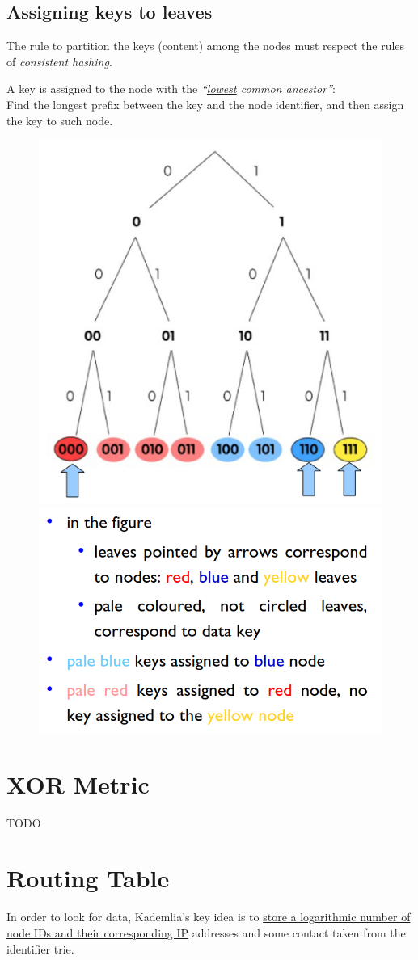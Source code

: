 \subsection{Assigning keys to leaves}
The rule to partition the keys (content) among the nodes must respect the rules of \textit{consistent hashing}.

\begin{paracol}{2}
   \begin{definition}
      A key is assigned to the node with the
      \textit{``\ul{lowest} common ancestor''}:\\
      Find the longest prefix between the
      key and the node identifier, and then assign the key to such node.
   \end{definition}
   \switchcolumn
   \begin{figure}[htbp]
      \centering
      \includegraphics[width=0.45\columnwidth]{images/kademlia_leaves01.png}
      \includegraphics[width=0.45\columnwidth]{images/kademlia_leaves02.png}
      \label{fig:kademlia_leaves}
   \end{figure}
\end{paracol}

\section{XOR Metric}

TODO

\section{Routing Table}
In order to look for data, Kademlia's key idea is to \ul{store a logarithmic number of node IDs and their corresponding IP} addresses and some contact taken from the identifier trie.

